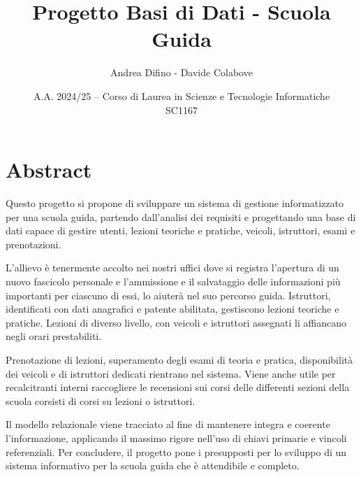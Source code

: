\documentclass[10pt]{article}
\author{Andrea Difino - Davide Colabove}
\date{A.A. 2024/25 -- Corso di Laurea in Scienze e Tecnologie Informatiche\\SC1167}
\begin{document}
\title{Progetto Basi di Dati - Scuola Guida}
\maketitle

\section{Abstract}{
    Questo progetto si propone di sviluppare un sistema di gestione informatizzato per una scuola guida, partendo dall’analisi dei requisiti e progettando una base di dati capace di gestire utenti, lezioni teoriche e pratiche, veicoli, istruttori, esami e prenotazioni.

    L'allievo è tenermente accolto nei nostri uffici dove si registra l'apertura di un nuovo fascicolo personale e l'ammissione e il salvataggio delle informazioni più importanti per ciascuno di essi, lo aiuterà nel suo percorso guida. Istruttori, identificati con dati anagrafici e patente abilitata, gestiscono lezioni teoriche e pratiche. Lezioni di diverso livello, con veicoli e istruttori assegnati li affiancano negli orari prestabiliti.

    Prenotazione di lezioni, superamento degli esami di teoria e pratica, disponibilità dei veicoli e di istruttori dedicati rientrano nel sistema. Viene anche utile per recalcitranti interni raccogliere le recensioni sui corsi delle differenti sezioni della scuola corsisti di corsi su lezioni o istruttori.

    Il modello relazionale viene tracciato al fine di mantenere integra e coerente l'informazione, applicando il massimo rigore nell'uso di chiavi primarie e vincoli referenziali. Per concludere, il progetto pone i presupposti per lo sviluppo di un sistema informativo per la scuola guida che è attendibile e completo.
}
\end{document}
